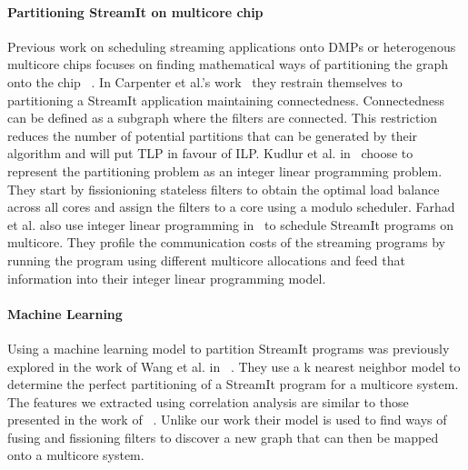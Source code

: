 \paragraph{Partitioning StreamIt on multicore chip}

Previous work on scheduling streaming applications onto DMPs or heterogenous multicore chips focuses on finding mathematical ways of partitioning the graph onto the chip ~\cite{carpenter2009streammap,kudlur2008orchestratingstreamprog}.  
In Carpenter et al.'s work~\cite{carpenter2009streammap} they restrain themselves to partitioning a StreamIt application maintaining connectedness.
Connectedness can be defined as a subgraph where the filters are connected. 
This restriction reduces the number of potential partitions that can be generated by their algorithm and will put TLP in favour of ILP. 
Kudlur et al. in~\cite{kudlur2008orchestratingstreamprog} choose to represent the partitioning problem as an integer linear programming problem.
They start by fissionioning stateless filters to obtain the optimal load balance across all cores and assign the filters to a core using a modulo scheduler.
Farhad et al. also use integer linear programming in~\cite{farhad2012streamilp} to schedule StreamIt programs on multicore.
They profile the communication costs of the streaming programs by running the program using different multicore allocations and feed that information into their integer linear programming model.

\paragraph{Machine Learning} Using a machine learning model to partition StreamIt programs was previously explored in the work of Wang et al. in ~\cite{wang2013partitionstreamit}.
They use a k nearest neighbor model to determine the perfect partitioning of a StreamIt program for a multicore system. 
The features we extracted using correlation analysis are similar to those presented in the work of ~\cite{wang2013partitionstreamit}.
Unlike our work their model is used to find ways of fusing and fissioning filters to discover a new graph that can then be mapped onto a multicore system.


